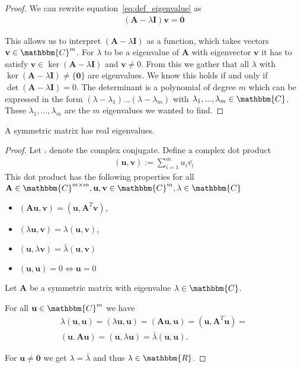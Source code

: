\begin{proof}
	We can rewrite equation~\ref{eq:def_eigenvalue} as
	\begin{align*}
		(\mathbf{A} - \lambda \mathbf{I})\mathbf{v} = \mathbf{0}
	\end{align*}
	
	This allows us to interpret $(\mathbf{A}-\lambda \mathbf{I})$ as a function, which takes vectors $\mathbf{v} \in \mathbbm{C}^m$. For $\lambda$ to be a eigenvalue of $\mathbf{A}$ with eigenvector $\mathbf{v}$ it has to satisfy $\mathbf{v} \in \ker(\mathbf{A} - \lambda \mathbf{I})$ and $\mathbf{v} \neq 0$. From this we gather that all $\lambda$ with $\ker(\mathbf{A} - \lambda \mathbf{I}) \neq \{\mathbf{0}\}$ are eigenvalues. We know this holds if and only if $\det(\mathbf{A} - \lambda \mathbf{I}) = 0$. The determinant is a polynomial of degree $m$ which can be expressed in the form $(\lambda - \lambda_1)...(\lambda - \lambda_m)$ with $\lambda_1, ..., \lambda_m \in \mathbbm{C}$. These $\lambda_1, ..., \lambda_m$ are the $m$ eigenvalues we wanted to find.
\end{proof}

\begin{lemma}
	A symmetric matrix has real eigenvalues.
\end{lemma}

\begin{proof}
	Let $\bar{.}$ denote the complex conjugate. Define a complex dot product
	\begin{align*}
		(\mathbf{u}, \mathbf{v}) := \sum_{i=1}^{m} u_i \bar{v_i}
	\end{align*}
	This dot product has the following properties for all $\mathbf{A} \in \mathbbm{C}^{m\times m}, \mathbf{u}, \mathbf{v} \in \mathbbm{C}^m, \lambda \in \mathbbm{C}$
	\begin{itemize}
		\item $(\mathbf{Au}, \mathbf{v}) = (\mathbf{u}, \mathbf{A}^T\mathbf{v})$,
		\item $(\lambda \mathbf{u}, \mathbf{v}) = \lambda(\mathbf{u}, \mathbf{v})$,
		\item $(\mathbf{u}, \lambda \mathbf{v}) = \bar{\lambda} (\mathbf{u}, \mathbf{v})$
		\item $(\mathbf{u}, \mathbf{u}) = 0 \iff \mathbf{u} = 0$
	\end{itemize}
	
	Let $\mathbf{A}$ be a symmetric matrix with eigenvalue $\lambda \in \mathbbm{C}$.
	
	For all $\mathbf{u} \in \mathbbm{C}^m$ we have
	\begin{align*}
		\lambda (\mathbf{u}, \mathbf{u}) = (\lambda \mathbf{u}, \mathbf{u}) = (\mathbf{Au}, \mathbf{u}) = (\mathbf{u}, \mathbf{A}^T\mathbf{u}) =\\
		(\mathbf{u}, \mathbf{Au}) =	(\mathbf{u}, \lambda\mathbf{u}) = \bar{\lambda} (\mathbf{u}, \mathbf{u}).
	\end{align*}
	
	For $\mathbf{u} \neq \mathbf{0}$ we get $\lambda = \bar{\lambda}$ and thus $\lambda \in \mathbbm{R}$.
\end{proof}

